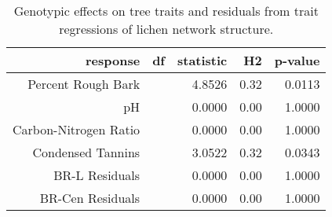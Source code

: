 \begin{table}[ht]
\centering
\begin{tabular}{rrrrr}
  \hline
response & df & statistic & H2 & p-value \\ 
  \hline
Percent Rough Bark &  & 4.8526 & 0.32 & 0.0113 \\ 
  pH &  & 0.0000 & 0.00 & 1.0000 \\ 
  Carbon-Nitrogen Ratio &  & 0.0000 & 0.00 & 1.0000 \\ 
  Condensed Tannins &  & 3.0522 & 0.32 & 0.0343 \\ 
  BR-L Residuals &  & 0.0000 & 0.00 & 1.0000 \\ 
  BR-Cen Residuals &  & 0.0000 & 0.00 & 1.0000 \\ 
   \hline
\end{tabular}
\caption{Genotypic effects on tree traits and residuals from trait regressions of lichen network structure.} 
\label{tab:h2_trait}
\end{table}

